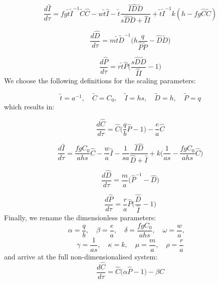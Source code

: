 \documentclass[9pt,twoside,lineno]{pnas-new}
\begin{document}
\begin{equation}
  \frac{d\hat{I}}{d\tau} = f g \tilde{t} \tilde{I}^{-1} \tilde{C} \hat{C} - w \tilde{t} \hat{I} - \tilde{t}\frac{\hat{I}\hat{D}\tilde{D}}{s\hat{D}\tilde{D} + \hat{I}\tilde{I}} + \tilde{t} \tilde{I}^{-1} k (h - f g \hat{C} \tilde{C})
\end{equation}

\begin{equation}
  \frac{d\hat{D}}{d\tau} = m \tilde{t} \tilde{D}^{-1} \Big( h \frac{q}{\hat{P}\tilde{P}} - \hat{D}\tilde{D}\Big)
\end{equation}

\begin{equation}
  \frac{d\hat{P}}{d\tau} = r \tilde{t} \hat{P}\Big(\frac{s\hat{D}\tilde{D}}{\hat{I}\tilde{I}} - 1\Big)
\end{equation}
%
We choose the following definitions for the scaling parameters:

\begin{equation}
  \tilde{t} = a^{-1}, \quad \tilde{C} = C_{0}, \quad \tilde{I} = hs , \quad \tilde{D} = h, \quad \tilde{P} = q
\end{equation}
%
which results in:

\begin{equation}
  \frac{d\hat{C}}{d \tau} = \hat{C} \Big(\frac{q}{b}\hat{P} - 1\Big) - \frac{e}{a} \hat{C}
\end{equation}

\begin{equation}
  \frac{d\hat{I}}{d\tau} = \frac{f g C_{0}}{ahs} \hat{C} - \frac{w}{a} \hat{I} - \frac{1}{sa} \frac{\hat{I}\hat{D}}{\hat{D} + \hat{I}} + k \Big(\frac{1}{as} - \frac{f g C_0}{ahs} \hat{C}\Big)
\end{equation}

\begin{equation}
  \frac{d\hat{D}}{d\tau } = \frac{m}{a} \Big( \hat{P}^{-1} - \hat{D}\Big)
\end{equation}

\begin{equation}
  \frac{d\hat{P}}{d\tau} = \frac{r}{a} \hat{P}\Big(\frac{\hat{D}}{\hat{I}} - 1\Big)
\end{equation}
%
Finally, we rename the dimensionless parameters:
%
\begin{equation}
  \alpha = \frac{q}{b}, \quad
  \beta = \frac{e}{a}, \quad
  \delta = \frac{f g C_{0}}{ahs}, \quad
  \omega = \frac{w}{a}, \quad
\end{equation}
\begin{equation}
  \gamma = \frac{1}{as}, \quad
  \kappa = k, \quad
  \mu = \frac{m}{a}, \quad
  \rho = \frac{r}{a}
\end{equation}
%
and arrive at the full non-dimensionalised system:
\begin{equation}
  \frac{d\hat{C}}{d \tau} = \hat{C} \Big(\alpha \hat{P} - 1\Big) - \beta \hat{C}
\end{equation}
\end{document}
